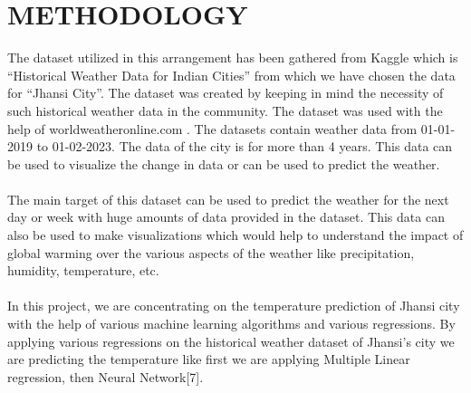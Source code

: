 \chapter{METHODOLOGY}
The dataset utilized in this arrangement has been gathered from Kaggle which is “Historical Weather Data for Indian Cities” from which we have chosen the data for “Jhansi City”. The dataset was created by keeping in mind the necessity of such historical weather data in the community. The dataset was used with the help of worldweatheronline.com . The datasets contain  weather data from 01-01-2019 to 01-02-2023. The data of the city is for more than 4 years. This data can be used to visualize the change in data or can be used to predict the weather.
\\
\\
The main target of this dataset can be used to predict the weather for the next day or week with huge amounts of data provided in the dataset.  This data can also be used to make visualizations which would help to understand the impact of global warming over the various aspects of the weather like precipitation, humidity, temperature, etc.
\\
\\
In this project, we are concentrating on the temperature prediction of Jhansi city with the help of various machine learning algorithms and various regressions. By applying various regressions on the historical weather dataset of Jhansi's city we are predicting the temperature like first we are applying Multiple Linear regression, then Neural Network[7].
\\
\\
\\
\\
\\
\\
